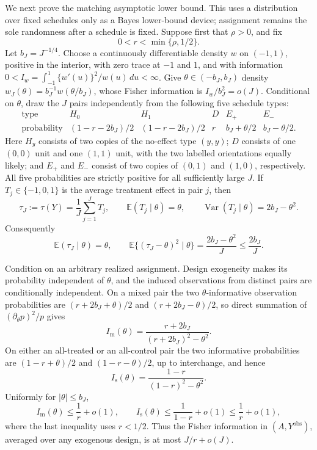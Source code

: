 We next prove the matching asymptotic lower bound.  This uses a distribution over fixed schedules only as a Bayes lower-bound device; assignment remains the sole randomness after a schedule is fixed.  Suppose first that \(\rho>0\), and fix
\[
 0<r<\min\{\rho,1/2\}.
\]
Let \(b_J=J^{-1/4}\).  Choose a continuously differentiable density \(w\) on \((-1,1)\), positive in the interior, with zero trace at \(-1\) and \(1\), and with information
\(
 0<I_w=\int_{-1}^1\{w'(u)\}^2/w(u)\,du<\infty
\).
Give \(\theta\in(-b_J,b_J)\) density
\(
 w_J(\theta)=b_J^{-1}w(\theta/b_J)
\), whose Fisher information is \(I_w/b_J^2=o(J)\).
Conditional on \(\theta\), draw the \(J\) pairs independently from the following five schedule types:
\[
\begin{array}{c|ccccc}
\text{type}&H_0&H_1&D&E_+&E_-\\ \hline
\text{probability}
 &(1-r-2b_J)/2&(1-r-2b_J)/2&r
 &b_J+\theta/2&b_J-\theta/2.
\end{array}
\]
Here \(H_y\) consists of two copies of the no-effect type \((y,y)\); \(D\) consists of one \((0,0)\) unit and one \((1,1)\) unit, with the two labelled orientations equally likely; and \(E_+\) and \(E_-\) consist of two copies of \((0,1)\) and \((1,0)\), respectively.  All five probabilities are strictly positive for all sufficiently large \(J\).  If \(T_j\in\{-1,0,1\}\) is the average treatment effect in pair \(j\), then
\[
 \tau_J:=\tau(Y)=\frac1J\sum_{j=1}^J T_j,
 \qquad
 \mathbb E(T_j\mid\theta)=\theta,
 \qquad
 \operatorname{Var}(T_j\mid\theta)=2b_J-\theta^2.
\]
Consequently
\[
 \mathbb E(\tau_J\mid\theta)=\theta,
 \qquad
 \mathbb E\{(\tau_J-\theta)^2\mid\theta\}
 =\frac{2b_J-\theta^2}{J}\le\frac{2b_J}{J}.
 \tag{2}
\]

Condition on an arbitrary realized assignment.  Design exogeneity makes its probability independent of \(\theta\), and the induced observations from distinct pairs are conditionally independent.  On a mixed pair the two \(\theta\)-informative observation probabilities are
\(
 (r+2b_J+\theta)/2
\) and
\(
 (r+2b_J-\theta)/2
\), so direct summation of \((\partial_\theta p)^2/p\) gives
\[
 I_{\mathrm m}(\theta)
 =\frac{r+2b_J}{(r+2b_J)^2-\theta^2}.
\]
On either an all-treated or an all-control pair the two informative probabilities are
\(
 (1-r+\theta)/2
\) and
\(
 (1-r-\theta)/2
\), up to interchange, and hence
\[
 I_{\mathrm s}(\theta)
 =\frac{1-r}{(1-r)^2-\theta^2}.
\]
Uniformly for \(|\theta|\le b_J\),
\[
 I_{\mathrm m}(\theta)\le \frac1r+o(1),
 \qquad
 I_{\mathrm s}(\theta)\le\frac1{1-r}+o(1)
 \le\frac1r+o(1),
 \tag{3}
\]
where the last inequality uses \(r<1/2\).  Thus the Fisher information in \((A,Y^{\mathrm{obs}})\), averaged over any exogenous design, is at most \(J/r+o(J)\).

